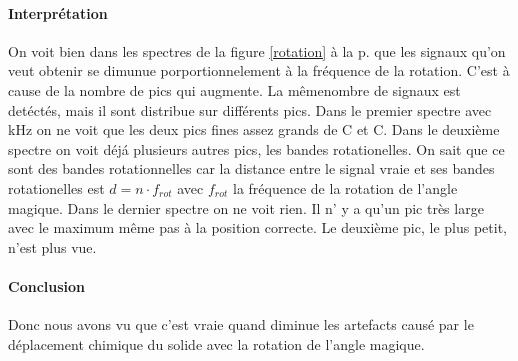 \documentclass[a4paper,12pt]{scrartcl}
\begin{document}
   \paragraph{Interprétation}
    On voit bien dans les spectres de la figure \ref{rotation} à la p. \pageref{rotation} que les signaux qu'on veut obtenir se dimunue porportionnelement à la fréquence de la rotation. C'est à cause de la nombre de pics qui augmente. La mêmenombre de signaux est detéctés, mais il sont distribue sur différents pics. Dans le premier spectre avec \unit[4]{kHz} on ne voit que les deux pics fines assez grands de  C et C. Dans le deuxième spectre on voit déjá plusieurs autres pics, les bandes rotationelles. On sait que ce sont des bandes rotationnelles car la distance entre le signal vraie et ses bandes rotationelles est $d=n\cdot f_{rot}$ avec $f_{rot}$ la fréquence de la rotation de l'angle magique. Dans le dernier spectre on ne voit rien. Il n' y a qu'un pic très large avec le maximum même pas à la position correcte. Le deuxième pic, le plus petit, n'est plus vue.

   \paragraph{Conclusion}
    Donc nous avons vu que c'est vraie quand diminue les artefacts causé par le déplacement chimique du solide avec la rotation de l'angle magique. 
\end{document}
